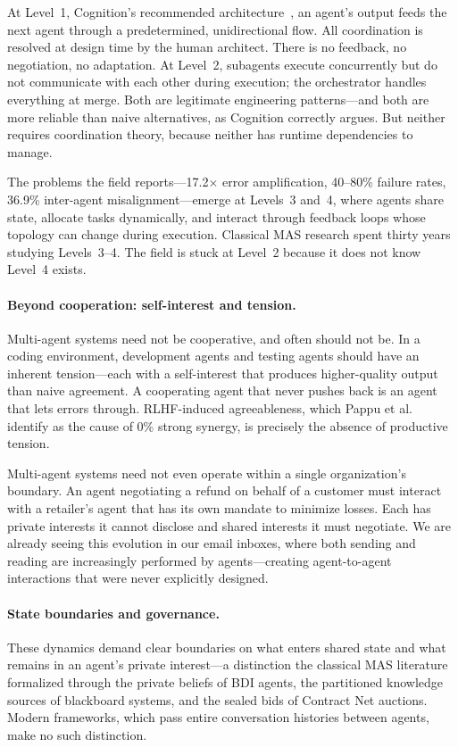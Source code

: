 \documentclass{article}
\begin{document}


\noindent
At Level~1, Cognition's recommended architecture~\citep{cognition2025dontbuild}, an
agent's output feeds the next agent through a predetermined, unidirectional flow.
All coordination is resolved at design time by the human architect.  There is no
feedback, no negotiation, no adaptation.  At Level~2, subagents execute concurrently
but do not communicate with each other during execution; the orchestrator handles
everything at merge.  Both are legitimate engineering patterns---and both are more
reliable than naive alternatives, as Cognition correctly argues.  But neither requires
coordination theory, because neither has runtime dependencies to manage.

The problems the field reports---17.2$\times$ error amplification, 40--80\% failure
rates, 36.9\% inter-agent misalignment---emerge at Levels~3 and~4, where agents share
state, allocate tasks dynamically, and interact through feedback loops whose topology
can change during execution.  Classical MAS research spent thirty years studying
Levels~3--4.  The field is stuck at Level~2 because it does not know Level~4 exists.

\paragraph{Beyond cooperation: self-interest and tension.}
Multi-agent systems need not be cooperative, and often should not be.  In a coding
environment, development agents and testing agents should have an inherent tension---each
with a self-interest that produces higher-quality output than naive agreement.  A
cooperating agent that never pushes back is an agent that lets errors through.
RLHF-induced agreeableness, which Pappu et al.~\citep{pappu2026multiagent} identify as
the cause of 0\% strong synergy, is precisely the absence of productive tension.

Multi-agent systems need not even operate within a single organization's boundary.  An
agent negotiating a refund on behalf of a customer must interact with a retailer's agent
that has its own mandate to minimize losses.  Each has private interests it cannot
disclose and shared interests it must negotiate.  We are already seeing this evolution
in our email inboxes, where both sending and reading are increasingly performed by
agents---creating agent-to-agent interactions that were never explicitly designed.

\paragraph{State boundaries and governance.}
These dynamics demand clear boundaries on what enters shared state and what remains in an
agent's private interest---a distinction the classical MAS literature formalized through
the private beliefs of BDI agents, the partitioned knowledge sources of blackboard
systems, and the sealed bids of Contract Net auctions.  Modern frameworks, which pass
entire conversation histories between agents, make no such distinction.
\end{document}
